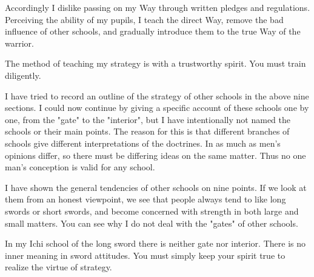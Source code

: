 Accordingly I dislike passing on my Way through written pledges and regulations. Perceiving the ability of my pupils, I teach the direct Way, remove the bad influence of other schools, and gradually introduce them to the true Way of the warrior.

The method of teaching my strategy is with a trustworthy spirit. You must train diligently.

I have tried to record an outline of the strategy of other schools in the above nine sections. I could now continue by giving a specific account of these schools one by one, from the "gate" to the "interior", but I have intentionally not named the schools or their main points. The reason for this is that different branches of schools give different interpretations of the doctrines. In as much as men's opinions differ, so there must be differing ideas on the same matter. Thus no one man's conception is valid for any school.

I have shown the general tendencies of other schools on nine points. If we look at them from an honest viewpoint, we see that people always tend to like long swords or short swords, and become concerned with strength in both large and small matters. You can see why I do not deal with the "gates" of other schools.

In my Ichi school of the long sword there is neither gate nor interior. There is no inner meaning in sword attitudes. You must simply keep your spirit true to realize the virtue of strategy. 
